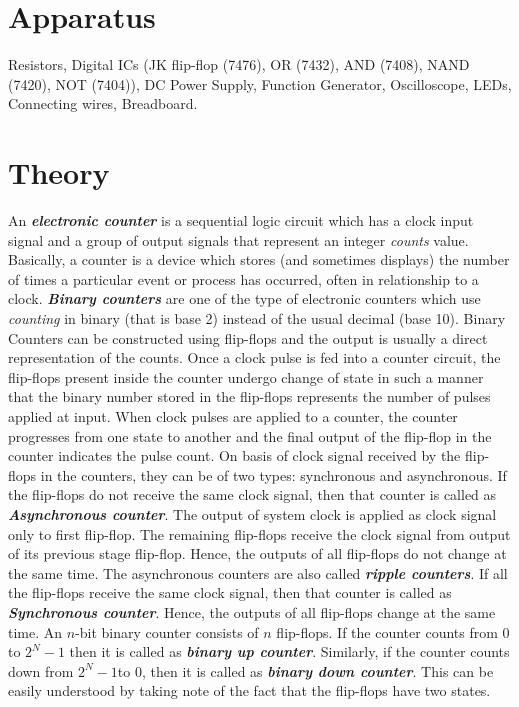 \section{Apparatus}
\noindent Resistors, Digital ICs (JK flip-flop (7476), OR (7432), AND (7408), NAND (7420), NOT (7404)), DC Power Supply, Function Generator, Oscilloscope, LEDs, Connecting wires, Breadboard.
\section{Theory}
\noindent
An \textbf{\emph{electronic counter}} is a sequential logic circuit which has a clock input signal and a group of output signals that represent an integer \emph{counts} value. Basically, a counter is a device which stores (and sometimes displays) the number of times a particular event or process has occurred, often in relationship to a clock.
\newline
\noindent
\textbf{\emph{Binary counters}} are one of the type of electronic counters which use \emph{counting} in binary (that is base 2) instead of the usual decimal (base 10). Binary Counters can be constructed using flip-flops and the output is usually a direct representation of the counts. Once a clock pulse is fed into a counter circuit, the flip-flops present inside the counter undergo change of state in such a manner that the binary number stored in the flip-flops represents the number of pulses applied at input. When clock 
pulses are applied to a counter, the counter progresses from one state to another and the 
final output of the flip-flop in the counter indicates the pulse count.
\newline
\noindent
On basis of clock signal received by the flip-flops in the counters, they can be of two types: synchronous and asynchronous. If the flip-flops do not receive the same clock signal, then that counter is called as \textbf{\emph{Asynchronous counter}}. The output of system clock is applied as clock signal only to first flip-flop. The remaining flip-flops receive the clock signal from output of its previous stage flip-flop. Hence, the outputs of all flip-flops do not change at the same time. The asynchronous counters are also called \textbf{\emph{ripple counters}}.
\newline
\noindent
If all the flip-flops receive the same clock signal, then that counter is called as \textbf{\emph{Synchronous counter}}. Hence, the outputs of all flip-flops change at the same time.
\newline
\noindent
An $n$-bit binary counter consists of $n$ flip-flops. If the counter counts from $0$ to $2^N - 1$ then it is called as \textbf{\emph{binary up counter}}. Similarly, if the counter counts down from $2^N - 1$to $0$, then it is called as \textbf{\emph{binary down counter}}. This can be easily understood by taking note of the fact that the flip-flops have two states.

